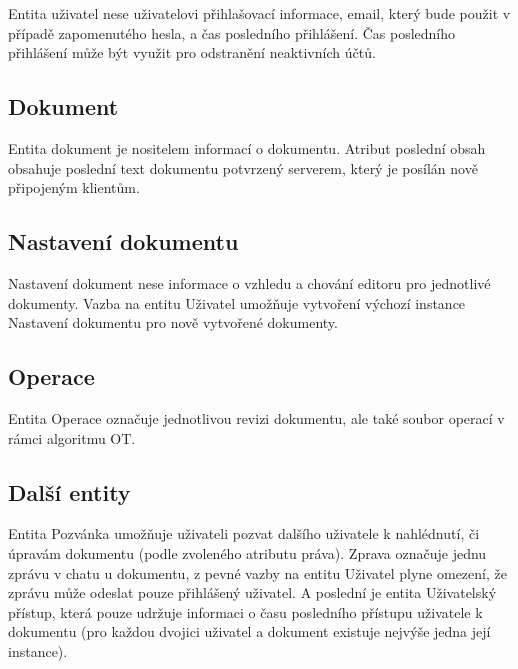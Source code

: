 Entita uživatel nese uživatelovi přihlašovací informace, email, který bude použit v případě zapomenutého hesla, a čas posledního přihlášení.
Čas posledního přihlášení může být využit pro odstranění neaktivních účtů.

\subsection{Dokument}\label{subsec:dokument}

Entita dokument je nositelem informací o dokumentu.
Atribut poslední obsah obsahuje poslední text dokumentu potvrzený serverem, který je posílán nově připojeným klientům.

\subsection{Nastavení dokumentu}\label{subsec:nastaveníDokumentu}

Nastavení dokument nese informace o vzhledu a chování editoru pro jednotlivé dokumenty.
Vazba na entitu Uživatel umožňuje vytvoření výchozí instance Nastavení dokumentu pro nově vytvořené dokumenty.

\subsection{Operace}\label{subsec:operace}

Entita Operace označuje jednotlivou revizi dokumentu, ale také soubor operací v rámci algoritmu \gls{OT}.

\subsection{Další entity}\label{subsec:dalšíEntity}

Entita Pozvánka umožňuje uživateli pozvat dalšího uživatele k nahlédnutí, či úpravám dokumentu (podle zvoleného atributu práva).
Zprava označuje jednu zprávu v chatu u dokumentu, z pevné vazby na entitu Uživatel plyne omezení, že zprávu může odeslat pouze přihlášený uživatel.
A poslední je entita Uživatelský přístup, která pouze udržuje informaci o času posledního přístupu uživatele k dokumentu (pro každou dvojici uživatel a dokument existuje nejvýše jedna její instance).
